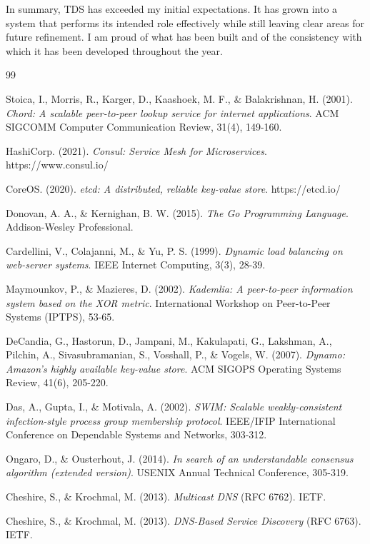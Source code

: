 \documentclass[10pt,a4paper]{article}
\begin{document}
In summary, TDS has exceeded my initial expectations. It has grown into a system that performs its intended role effectively while still leaving clear areas for future refinement. I am proud of what has been built and of the consistency with which it has been developed throughout the year.


\newpage
\begin{thebibliography}{99}

Stoica, I., Morris, R., Karger, D., Kaashoek, M. F., \& Balakrishnan, H. (2001).
\textit{Chord: A scalable peer-to-peer lookup service for internet applications}.
ACM SIGCOMM Computer Communication Review, 31(4), 149-160.

HashiCorp. (2021).
\textit{Consul: Service Mesh for Microservices}.
https://www.consul.io/

CoreOS. (2020).
\textit{etcd: A distributed, reliable key-value store}.
https://etcd.io/

Donovan, A. A., \& Kernighan, B. W. (2015).
\textit{The Go Programming Language}.
Addison-Wesley Professional.

Cardellini, V., Colajanni, M., \& Yu, P. S. (1999).
\textit{Dynamic load balancing on web-server systems}.
IEEE Internet Computing, 3(3), 28-39.

Maymounkov, P., \& Mazieres, D. (2002).
\textit{Kademlia: A peer-to-peer information system based on the XOR metric}.
International Workshop on Peer-to-Peer Systems (IPTPS), 53-65.

DeCandia, G., Hastorun, D., Jampani, M., Kakulapati, G., Lakshman, A., Pilchin, A., Sivasubramanian, S., Vosshall, P., \& Vogels, W. (2007).
\textit{Dynamo: Amazon's highly available key-value store}.
ACM SIGOPS Operating Systems Review, 41(6), 205-220.

Das, A., Gupta, I., \& Motivala, A. (2002).
\textit{SWIM: Scalable weakly-consistent infection-style process group membership protocol}.
IEEE/IFIP International Conference on Dependable Systems and Networks, 303-312.

Ongaro, D., \& Ousterhout, J. (2014).
\textit{In search of an understandable consensus algorithm (extended version)}.
USENIX Annual Technical Conference, 305-319.

Cheshire, S., \& Krochmal, M. (2013).
\textit{Multicast DNS} (RFC 6762).
IETF.

Cheshire, S., \& Krochmal, M. (2013).
\textit{DNS-Based Service Discovery} (RFC 6763).
IETF.


\end{thebibliography}
\end{document}
